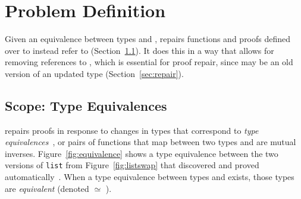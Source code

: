 \section{Problem Definition}
\label{sec:key1}

Given an equivalence between types \A and \B,
\toolname repairs functions and proofs defined over \A to instead refer to \B (Section~\ref{sec:scope}).
It does this in a way that allows for removing references to \A, which is essential for proof repair,
since \A may be an old version of an updated type (Section~\ref{sec:repair}).



\subsection{Scope: Type Equivalences}
\label{sec:scope}

\toolname repairs proofs in response to changes in types that correspond to \textit{type equivalences}~\cite{univalent2013homotopy},
or pairs of functions that map between two types and are mutual inverses.
Figure~\ref{fig:equivalence} shows a type equivalence between the two versions of \lstinline{list}
from Figure~\ref{fig:listswap} that \toolname discovered and proved automatically~.
When a type equivalence between types \A and \B exists, those types are \textit{equivalent} (denoted \A $\simeq$ \B). %
%

